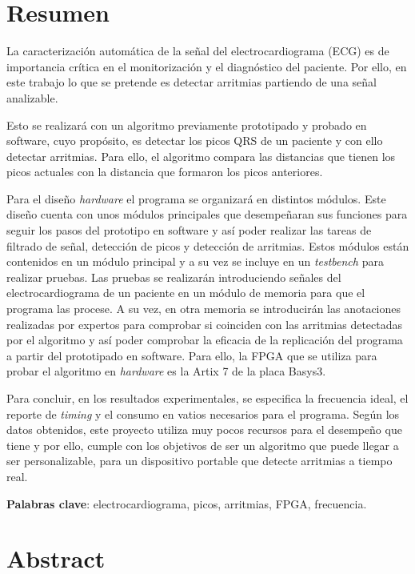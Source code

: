 \chapter{Resumen}

La caracterización automática de la señal del electrocardiograma (ECG) es de importancia crítica en el monitorización y el diagnóstico del paciente. Por ello, en este trabajo lo que se pretende es detectar arritmias partiendo de una señal analizable. 

Esto se realizará con un algoritmo previamente prototipado y probado en software, cuyo propósito, es detectar los picos QRS de un paciente y con ello detectar arritmias. Para ello, el algoritmo compara las distancias que tienen los picos actuales con la distancia que formaron los picos anteriores.

Para el diseño  \textit{hardware}  el programa se organizará en distintos módulos. Este diseño cuenta con unos módulos principales que desempeñaran sus funciones para seguir los pasos del prototipo en software y así poder realizar las tareas de filtrado de señal, detección de picos y detección de arritmias.
Estos módulos están contenidos en un módulo principal y a su vez se incluye en un \textit{testbench} para realizar pruebas. Las pruebas se realizarán introduciendo señales del electrocardiograma de un paciente en un módulo de memoria para que el programa las procese. A su vez, en otra memoria se introducirán las anotaciones realizadas por expertos para comprobar si coinciden con las arritmias detectadas por el algoritmo y así poder comprobar la eficacia de la replicación del programa a partir del prototipado en software. Para ello, la FPGA que se utiliza para probar el algoritmo en  \textit{hardware}  es la Artix 7 de la placa Basys3.

Para concluir, en los resultados experimentales, se especifica la frecuencia ideal, el reporte de \textit{timing} y el consumo en vatios necesarios para el programa. Según los datos obtenidos, este proyecto utiliza muy pocos recursos para el desempeño que tiene y por ello, cumple con los objetivos de ser un algoritmo que puede llegar a ser personalizable, para un dispositivo portable que detecte arritmias a tiempo real.

\noindent\textbf{Palabras clave}: electrocardiograma, picos, arritmias, FPGA, frecuencia.

\chapter{Abstract}

